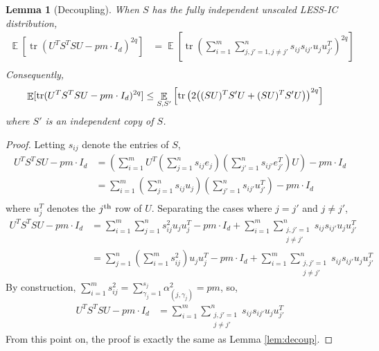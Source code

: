 \documentclass[11pt]{amsart}
\numberwithin{equation}{section}
\numberwithin{equation}{section}
\DeclareMathOperator{\E}{\mathbb{E}}
\DeclareMathOperator*{\tr}{tr}
\DeclarePairedDelimiter{\paren}{(}{)}
\newtheorem{lemma}[theorem]{Lemma}
\theoremstyle{remark}
\theoremstyle{definition}
\begin{document}
\begin{lemma}[Decoupling] \label{lem:decoupless}
When $S$ has the fully independent unscaled LESS-IC distribution,
\begin{align*}
    \E [ \tr (U^TS^TSU - pm\cdot I_d)^{2q} ] &= \E \left[ \tr \left( \sum_{i=1}^m \sum_{j,j' =1, j \neq j'}^n s_{ij}s_{ij'} u_ju_{j'}^T \right)^{2q} \right] \\
\end{align*}
Consequently,
\begin{align*}
    \E [ \tr (U^TS^TSU - pm\cdot I_d)^{2q} ] &\le \E_{S,S'} \left[ \tr \left(  2\paren*{(SU)^TS'U + (SU)^TS'U} \right)^{2q} \right]
\end{align*}
where $S'$ is an independent copy of $S$.
\end{lemma}
\begin{proof}
    Letting $s_{ij}$ denote the entries of $S$, 
\begin{align*}
    U^TS^TSU - pm\cdot I_d &= \left( \sum_{i=1}^m U^T\left( \sum_{j=1}^n s_{ij}e_{j} \right) \left( \sum_{j'=1}^n s_{ij'}e_{j'}^T \right)U \right) - pm\cdot I_d \\
    &=  \sum_{i=1}^m \left( \sum_{j=1}^n s_{ij}u_{j} \right) \left( \sum_{j'=1}^n s_{ij'}u_{j'}^T \right)  - pm\cdot I_d \\
\end{align*}
where $u_j^T$ denotes the $j\textsuperscript{th}$ row of $U$. Separating the cases where $j=j'$ and $j \neq j'$, 
\begin{align*}
    U^TS^TSU - pm\cdot I_d &=  \sum_{i=1}^m \sum_{j=1}^n s_{ij}^2 u_ju_j^T  - pm\cdot I_d + \sum_{i=1}^m \sum_{\substack{j,j' =1 \\ j \neq j'}}^n s_{ij}s_{ij'} u_ju_{j'}^T \\
    &=  \sum_{j=1}^n \left( \sum_{i=1}^m s_{ij}^2 \right) u_ju_j^T  - pm\cdot I_d + \sum_{i=1}^m \sum_{\substack{j,j' =1 \\ j \neq j'}}^n s_{ij}s_{ij'} u_ju_{j'}^T
\end{align*}
By construction, $\sum_{i=1}^m s_{ij}^2 = \sum_{\gamma_j =1}^{s_j} \alpha_{(j, \gamma_j)}^2 = pm$, so,
\begin{align*}
    U^TS^TSU - pm\cdot I_d &= \sum_{i=1}^m \sum_{\substack{j,j' =1 \\ j \neq j'}}^n s_{ij}s_{ij'} u_ju_{j'}^T
\end{align*}
    From this point on, the proof is exactly the same as Lemma \ref{lem:decoup}.
\end{proof}
\end{document}
